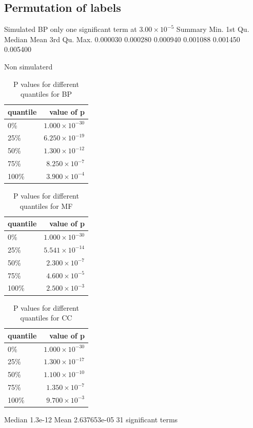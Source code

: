\subsection{Permutation of labels}
Simulated 
BP only one significant term at $3.00 \times 10^{-5}$
Summary
   Min.  1st Qu.   Median     Mean  3rd Qu.     Max. 
0.000030 0.000280 0.000940 0.001088 0.001450 0.005400 

Non simulaterd
\begin{table}[ht]
\centering
\begin{tabular}{lr}
  \hline
quantile & value of p \\ 
  \hline
0\% & $1.000 \times 10^{-30}$ \\ 
  25\% & $6.250 \times 10^{-19}$ \\ 
  50\% & $1.300 \times 10^{-12}$ \\ 
  75\% & $8.250 \times 10^{-7}$ \\ 
  100\% & $3.900 \times 10^{-4}$ \\ 
   \hline
\end{tabular}
\caption{P values for different quantiles for BP} 
\label{tabP values for different quantiles for BP}
\end{table}

\begin{table}[ht]
\centering
\begin{tabular}{lr}
  \hline
quantile & value of p \\ 
  \hline
0\% & $1.000 \times 10^{-30}$ \\ 
  25\% & $5.541 \times 10^{-14}$ \\ 
  50\% & $2.300 \times 10^{-7}$ \\ 
  75\% & $4.600 \times 10^{-5}$ \\ 
  100\% & $2.500 \times 10^{-3}$ \\ 
   \hline
\end{tabular}
\caption{P values for different quantiles for MF} 
\label{tabP values for different quantiles for MF}
\end{table}

\begin{table}[ht]
\centering
\begin{tabular}{lr}
  \hline
quantile & value of p \\ 
  \hline
0\% & $1.000 \times 10^{-30}$ \\ 
  25\% & $1.300 \times 10^{-17}$ \\ 
  50\% & $1.100 \times 10^{-10}$ \\ 
  75\% & $1.350 \times 10^{-7}$ \\ 
  100\% & $9.700 \times 10^{-3}$ \\ 
   \hline
\end{tabular}
\caption{P values for different quantiles for CC} 
\label{tabP values for different quantiles for CC}
\end{table}
Median 1.3e-12
Mean 2.637653e-05
31 significant terms



